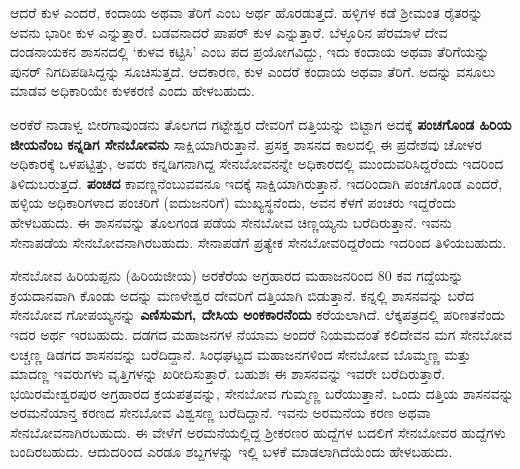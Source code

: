 \vskip 2pt

ಆದರೆ ಕುಳ ಎಂದರೆ, ಕಂದಾಯ ಅಥವಾ ತೆರಿಗೆ ಎಂಬ ಅರ್ಥ ಹೊರಡುತ್ತದೆ. ಹಳ್ಳಿಗಳ ಕಡೆ ಶ‍್ರೀಮಂತ ರೈತರನ್ನು ಅವನು ಭಾರೀ ಕುಳ ಎನ್ನುತ್ತಾರೆ. ಬಡವನಾದರೆ ಪಾಪರ್​ ಕುಳ ಎನ್ನುತ್ತಾರೆ. ಬೆಳ್ಳೂರಿನ ಪೆರಮಾಳೆ ದೇವ ದಂಡನಾಯಕನ ಶಾಸನದಲ್ಲಿ ‘ಕುಳವ ಕಟ್ಟಿಸಿ’ ಎಂಬ ಪದ ಪ್ರಯೋಗವಿದ್ದು, ಇದು ಕಂದಾಯ ಅಥವಾ ತೆರಿಗೆಯನ್ನು ಪುನರ್​ ನಿಗದಿಪಡಿಸಿದ್ದನ್ನು ಸೂಚಿಸುತ್ತದೆ. ಆದಕಾರಣ, ಕುಳ ಎಂದರೆ ಕಂದಾಯ ಅಥವಾ ತೆರಿಗೆ. ಅದನ್ನು ವಸೂಲು ಮಾಡವ ಅಧಿಕಾರಿಯೇ ಕುಳಕರಣಿ ಎಂದು ಹೇಳಬಹುದು.

ಅರಕೆರೆ ನಾಡಾಳ್ವ ಬೀರಗಾವುಂಡನು ತೊಲಗದ ಗಟ್ಟೇಶ್ವರ ದೇವರಿಗೆ ದತ್ತಿಯನ್ನು ಬಿಟ್ಟಾಗ ಅದಕ್ಕೆ \textbf{ಪಂಚಗೊಂಡ ಹಿರಿಯ ಜೀಯನೆಂಬ} \textbf{ಕನ್ನಡಿಗ ಸೇನಬೋವನು} ಸಾಕ್ಷಿಯಾಗಿರುತ್ತಾನೆ. ಪ್ರಸಕ್ತ ಶಾಸನದ ಕಾಲದಲ್ಲಿ ಈ ಪ್ರದೇಶವು ಚೋಳರ ಅಧಿಕಾರಕ್ಕೆ ಒಳಪಟ್ಟಿತ್ತು, ಅವರು ಕನ್ನಡಿಗನಾಗಿದ್ದ ಸೇನಬೋವನನ್ನೇ ಅಧಿಕಾರದಲ್ಲಿ ಮುಂದುವರಿಸಿದ್ದರೆಂದು ಇದರಿಂದ ತಿಳಿದುಬರುತ್ತದೆ. \textbf{ಪಂಚದ} ಕಾವಣ್ಣನೆಂಬುವವನೂ ಇದಕ್ಕೆ ಸಾಕ್ಷಿಯಾಗಿರುತ್ತಾನೆ. ಇದರಿಂದಾಗಿ ಪಂಚಗೊಂಡ ಎಂದರೆ, ಹಳ್ಳಿಯ ಅಧಿಕಾರಿಗಳಾದ ಪಂಚರಿಗೆ (ಐದುಜನರಿಗೆ) ಮುಖ್ಯಸ್ಥನೆಂದು, ಅವನ ಕೆಳಗೆ ಪಂಚರು ಇದ್ದರೆಂದು ಹೇಳಬಹುದು. ಈ ಶಾಸನವನ್ನು ತೊಲಗಂಡ ಪಡೆಯ ಸೇನಬೋವ ಚಿಣ್ಣಯ್ಯನು ಬರೆದಿರುತ್ತಾನೆ. ಇವನು ಸೇನಾಪಡೆಯ ಸೇನಬೋವನಾಗಿರಬಹುದು. ಸೇನಾಪಡೆಗೆ ಪ್ರತ್ಯೇಕ ಸೇನಬೋವರಿದ್ದರೆಂದು ಇದರಿಂದ ತಿಳಿಯಬಹುದು.

ಸೇನಬೋವ ಹಿರಿಯಪ್ಪನು (ಹಿರಿಯಜೀಯ) ಅರಕೆರೆಯ ಅಗ್ರಹಾರದ ಮಹಾಜನರಿಂದ 80 ಕವ ಗದ್ದೆಯನ್ನು ಕ್ರಯದಾನವಾಗಿ ಕೊಂಡು ಅದನ್ನು ಮಣಳೇಶ್ವರ ದೇವರಿಗೆ ದತ್ತಿಯಾಗಿ ಬಿಡುತ್ತಾನೆ. ಕನ್ನಲ್ಲಿ ಶಾಸನವನ್ನು ಬರೆದ ಸೇನಬೋವ ಗೋಪಯ್ಯನನ್ನು \textbf{ಎಣಿಸುಮಗ, ದೇಸಿಯ ಅಂಕಕಾರನೆಂದು} ಕರೆಯಲಾಗಿದೆ. ಲೆಕ್ಕಪತ್ರದಲ್ಲಿ ಪರಿಣತನೆಂದು ಇದರ ಅರ್ಥ ಇರಬಹುದು. ದಡಗದ ಮಹಾಜನಗಳ ನೆಯಾಮ ಅಂದರೆ ನಿಯಮದಂತೆ ಕಲಿದೇವನ ಮಗ ಸೇನಬೋವ ಲಚ್ಚಣ್ಣ ಡಿಡಗದ ಶಾಸನವನ್ನು ಬರೆದಿದ್ದಾನೆ. ಸಿಂಧಘಟ್ಟದ ಮಹಾಜನಗಳಿಂದ ಸೇನಬೋವ ಬೊಮ್ಮಣ್ಣ ಮತ್ತು ಮಾದಣ್ಣ ಇವರುಗಳು ವೃತ್ತಿಗಳನ್ನು ಖರೀದಿಸುತ್ತಾರೆ. ಬಹುಶಃ ಈ ಶಾಸನವನ್ನು ಇವರೇ ಬರೆದಿರುತ್ತಾರೆ. ಭಯಿರಮೇಶ್ವರಪುರ ಅಗ್ರಹಾರದ ಕ್ರಯಪತ್ರವನ್ನು, ಸೇನಬೋವ ಗುಮ್ಮಣ್ಣ ಬರೆಯುತ್ತಾನೆ. ಒಂದು ದತ್ತಿಯ ಶಾಸನವನ್ನು ಅರಮನೆಯಾನ್ತ ಕರಣದ ಸೇನಬೋವ ವಿಶ್ವಸಣ್ಣ ಬರೆದಿದ್ದಾನೆ. ಇವನು ಅರಮನೆಯ ಕರಣ ಅಥವಾ ಸೇನಬೋವನಾಗಿರಬಹುದು. ಈ ವೇಳೆಗೆ ಅರಮನೆಯಲ್ಲಿದ್ದ ಶ‍್ರೀಕರಣರ ಹುದ್ದೆಗಳ ಬದಲಿಗೆ ಸೇನಬೋವರ ಹುದ್ದೆಗಳು ಬಂದಿರಬಹುದು. ಆದುದರಿಂದ ಎರಡೂ ಶಬ್ದಗಳನ್ನು ಇಲ್ಲಿ ಬಳಕೆ ಮಾಡಲಾಗಿದೆಯೆಂದು ಹೇಳಬಹುದು.

